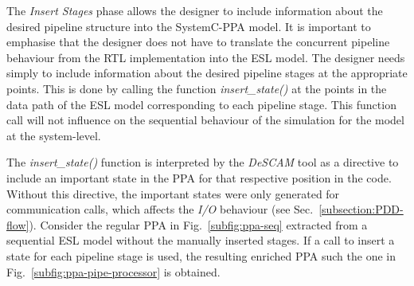 The \textit{Insert Stages} phase allows the designer to include information about the desired pipeline structure into the SystemC-PPA model. It is important to emphasise that the designer does not have to translate the concurrent pipeline behaviour from the RTL implementation into the ESL model. The designer needs simply to include information about the desired pipeline stages at the appropriate points. This is done by calling the function \textit{insert\_state()} at the points in the data path of the ESL model corresponding to each pipeline stage. This function call will not influence on the sequential behaviour of the simulation for the model at the system-level.

The \textit{insert\_state()} function is interpreted by the \textit{DeSCAM} tool as a directive to include an important state in the PPA for that respective position in the code. Without this directive, the important states were only generated for communication calls, which affects the \textit{I/O} behaviour (see Sec.~\ref{subsection:PDD-flow}). Consider the regular PPA in Fig.~\ref{subfig:ppa-seq} extracted from a sequential ESL model without the manually inserted stages. If a call to insert a state for each pipeline stage is used, the resulting enriched PPA such the one in Fig.~\ref{subfig:ppa-pipe-processor} is obtained.

